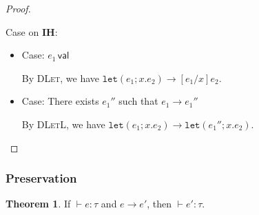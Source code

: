 \documentclass{article}
\theoremstyle{definition}
\newtheorem{theorem}{Theorem}[section]
\begin{document}
\begin{proof}
\begin{itemize}
              Case on \textbf{IH}:
              \begin{itemize}
                  \item Case: $e_1\, \mathsf{val}$

                        By \textsc{DLet}, we have $\mathtt{let}(e_1;x.e_2) \longrightarrow [e_1/x]e_2$.

                  \item Case: There exists $e_1''$ such that $e_1 \longrightarrow e_1''$

                        By \textsc{DLetL}, we have $\mathtt{let}(e_1;x.e_2) \longrightarrow \mathtt{let}(e_1'';x.e_2)$.
              \end{itemize}
    \end{itemize}
\end{proof}

\subsubsection*{Preservation}

\begin{theorem}
    If $\vdash e:\tau$ and $e\longrightarrow e'$, then $\vdash e':\tau$.
\end{theorem}
\end{document}
